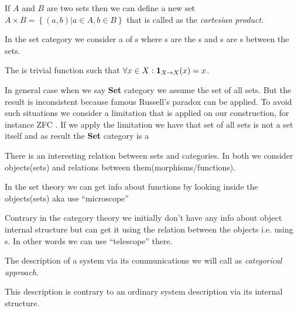 \begin{definition}
  \label{def:cartesian_product}
  If $A$ and $B$ are two sets then we can define a new set $A \times B
  = \left\{(a,b)|a \in A, b \in B\right\}$ that is called as the
  \textit{cartesian product}.
\end{definition}


\begin{definition}
  \label{def:setcategory}
  In the set category we consider a  of
  s where 
  s are the s and
  s are s between the
  sets.

  The  is trivial function such that $\forall x \in
  X: \mathbf{1}_{ X \to X }(x) = x$.

  In general case when we say \textbf{Set} category we assume the set
  of all sets. But the result is inconsistent because famous Russell's
  paradox \cite{wiki:russell_paradox} can be applied. To avoid such
  situations we consider a limitation that is applied on our
  construction, for instance 
  ZFC \cite{wiki:zfc}. If we apply the limitation we have that set of
  all sets is not a set itself and as result the  \textbf{Set}
  category is a 
\end{definition}

\begin{remark}
  \label{rem:set_vs_category}
  There is an interesting relation between sets and categories. In both
  we consider objects(sets) and relations between
  them(morphisms/functions). 

  In the set theory we can get info about functions by looking inside
  the objects(sets) aka use ``microscope'' \cite{bib:milewski2018category} 

  Contrary in the category theory we initially don't have any info about object
  internal structure but can get it using the relation between the
  objects i.e. using s. In other words we can use
  ``telescope'' \cite{bib:milewski2018category}  there.
\end{remark}

\begin{definition}
\label{def:categorical_approach}
The description of a system via its communications we will call as
\textit{categorical approach}.

This description is contrary to an ordinary system description via its
internal structure.
\end{definition}

